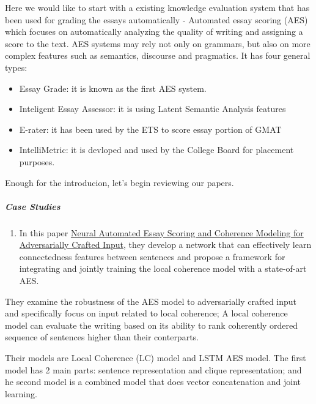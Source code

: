 \documentclass[]{book}
\providecommand{\tightlist}{%
  \setlength{\itemsep}{0pt}\setlength{\parskip}{0pt}}
\let\oldsubparagraph\subparagraph
\renewcommand{\subparagraph}[1]{\oldsubparagraph{#1}\mbox{}}
\theoremstyle{definition}
\theoremstyle{definition}
\theoremstyle{definition}
\theoremstyle{remark}
\begin{document}
Here we would like to start with a existing knowledge evaluation system
that has been used for grading the essays automatically - Automated
essay scoring (AES) which focuses on automatically analyzing the quality
of writing and assigning a score to the text. AES systems may rely not
only on grammars, but also on more complex features such as semantics,
discourse and pragmatics. It has four general types:

\begin{itemize}
\item
  Essay Grade: it is known as the first AES system.
\item
  Inteligent Essay Assessor: it is using Latent Semantic Analysis
  features
\item
  E-rater: it has been used by the ETS to score essay portion of GMAT
\item
  IntelliMetric: it is devloped and used by the College Board for
  placement purposes.
\end{itemize}

Enough for the introducion, let's begin reviewing our papers.

\subparagraph{Case Studies}\label{case-studies-4}

\begin{enumerate}
\def\labelenumi{\arabic{enumi}.}
\tightlist
\item
  In this paper \href{http://aclweb.org/anthology/N18-1024}{Neural
  Automated Essay Scoring and Coherence Modeling for Adversarially
  Crafted Input}, they develop a network that can effectively learn
  connectedness features between sentences and propose a framework for
  integrating and jointly training the local coherence model with a
  state-of-art AES.
\end{enumerate}

They examine the robustness of the AES model to adversarially crafted
input and specifically focus on input related to local coherence; A
local coherence model can evaluate the writing based on its ability to
rank coherently ordered sequence of sentences higher than their
conterparts.

Their models are Local Coherence (LC) model and LSTM AES model. The
first model has 2 main parts: sentence representation and clique
representation; and he second model is a combined model that does vector
concatenation and joint learning.
\end{document}
